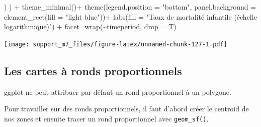 \documentclass[
]{book}
\newenvironment{Shaded}{\begin{snugshade}}{\end{snugshade}}
\newcommand{\AttributeTok}[1]{\textcolor[rgb]{0.77,0.63,0.00}{#1}}
\newcommand{\FunctionTok}[1]{\textcolor[rgb]{0.00,0.00,0.00}{#1}}
\newcommand{\NormalTok}[1]{#1}
\newcommand{\SpecialCharTok}[1]{\textcolor[rgb]{0.00,0.00,0.00}{#1}}
\newcommand{\StringTok}[1]{\textcolor[rgb]{0.31,0.60,0.02}{#1}}
\begin{document}
\begin{Shaded}
\begin{Highlighting}[]
\NormalTok{             )}
\NormalTok{           ) }\SpecialCharTok{+}
           \FunctionTok{theme\_minimal}\NormalTok{()}\SpecialCharTok{+}
           \FunctionTok{theme}\NormalTok{(}\AttributeTok{legend.position =} \StringTok{"bottom"}\NormalTok{,}
                 \AttributeTok{panel.background =} \FunctionTok{element\_rect}\NormalTok{(}\AttributeTok{fill =} \StringTok{"light blue"}\NormalTok{))}\SpecialCharTok{+}
           \FunctionTok{labs}\NormalTok{(}\AttributeTok{fill =} \StringTok{"Taux de mortalité infantile (échelle logarithmique)"}\NormalTok{) }\SpecialCharTok{+}
           \FunctionTok{facet\_wrap}\NormalTok{(}\SpecialCharTok{\textasciitilde{}}\NormalTok{timeperiod, }\AttributeTok{drop =}\NormalTok{ T)}
\end{Highlighting}
\end{Shaded}

\texttt{[image: support\_m7\_files/figure-latex/unnamed-chunk-127-1.pdf]}

\hypertarget{les-cartes-uxe0-ronds-proportionnels}{%
\subsection{Les cartes à ronds proportionnels}\label{les-cartes-uxe0-ronds-proportionnels}}

ggplot ne peut attribuer par défaut un rond proportionnel à un polygone.

Pour travailler sur des ronds proportionnels, il faut d'abord créer le centroid de nos zones et ensuite tracer un rond proportionnel avec \texttt{geom\_sf()}.
\end{document}
